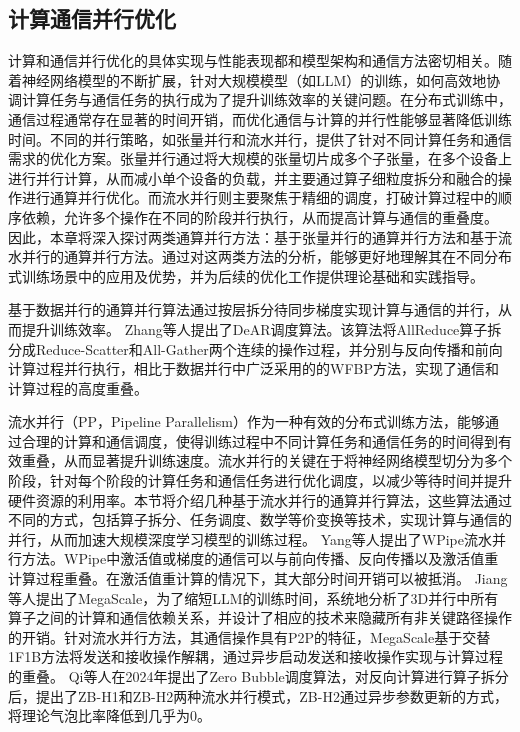 \subsection{计算通信并行优化}

计算和通信并行优化的具体实现与性能表现都和模型架构和通信方法密切相关。随着神经网络模型的不断扩展，针对大规模模型（如LLM）的训练，如何高效地协调计算任务与通信任务的执行成为了提升训练效率的关键问题。在分布式训练中，通信过程通常存在显著的时间开销，而优化通信与计算的并行性能够显著降低训练时间。不同的并行策略，如张量并行和流水并行，提供了针对不同计算任务和通信需求的优化方案。张量并行通过将大规模的张量切片成多个子张量，在多个设备上进行并行计算，从而减小单个设备的负载，并主要通过算子细粒度拆分和融合的操作进行通算并行优化。而流水并行则主要聚焦于精细的调度，打破计算过程中的顺序依赖，允许多个操作在不同的阶段并行执行，从而提高计算与通信的重叠度。
因此，本章将深入探讨两类通算并行方法：基于张量并行的通算并行方法和基于流水并行的通算并行方法。通过对这两类方法的分析，能够更好地理解其在不同分布式训练场景中的应用及优势，并为后续的优化工作提供理论基础和实践指导。

基于数据并行的通算并行算法通过按层拆分待同步梯度实现计算与通信的并行，从而提升训练效率。
Zhang等人\cite{zhang2023dear}提出了DeAR调度算法。该算法将AllReduce算子拆分成Reduce-Scatter和All-Gather两个连续的操作过程，并分别与反向传播和前向计算过程并行执行，相比于数据并行中广泛采用的的WFBP方法\cite{zhang2017poseidon}，实现了通信和计算过程的高度重叠。

流水并行（PP，Pipeline Parallelism）作为一种有效的分布式训练方法，能够通过合理的计算和通信调度，使得训练过程中不同计算任务和通信任务的时间得到有效重叠，从而显著提升训练速度。流水并行的关键在于将神经网络模型切分为多个阶段，针对每个阶段的计算任务和通信任务进行优化调度，以减少等待时间并提升硬件资源的利用率。本节将介绍几种基于流水并行的通算并行算法，这些算法通过不同的方式，包括算子拆分、任务调度、数学等价变换等技术，实现计算与通信的并行，从而加速大规模深度学习模型的训练过程。
Yang等人\cite{yang2022group}提出了WPipe流水并行方法。WPipe中激活值或梯度的通信可以与前向传播、反向传播以及激活值重计算过程重叠。在激活值重计算的情况下，其大部分时间开销可以被抵消。
Jiang等人\cite{jiang2024megascale}提出了MegaScale，为了缩短LLM的训练时间，系统地分析了3D并行中所有算子之间的计算和通信依赖关系，并设计了相应的技术来隐藏所有非关键路径操作的开销。针对流水并行方法，其通信操作具有P2P的特征，MegaScale基于交替1F1B方法将发送和接收操作解耦，通过异步启动发送和接收操作实现与计算过程的重叠。
Qi等人\cite{qi2024zero}在2024年提出了Zero Bubble调度算法，对反向计算进行算子拆分后，提出了ZB-H1和ZB-H2两种流水并行模式，ZB-H2通过异步参数更新的方式，将理论气泡比率降低到几乎为0。

